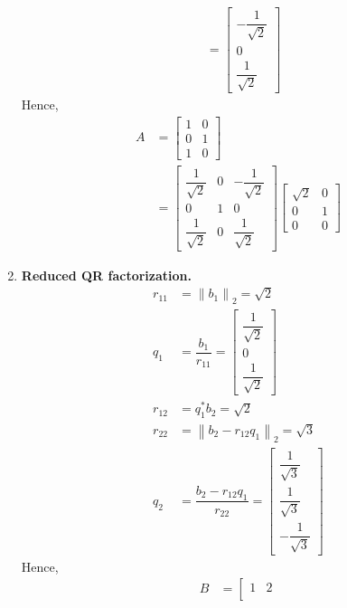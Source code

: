 \documentclass[a4paper,oneside]{book}
\numberwithin{equation}{chapter}
\begin{document}
\begin{enumerate}
\begin{align}
 &= \left[ {\begin{array}{*{20}{c}}
{ - \dfrac{1}{{\sqrt 2 }}}\\
0\\
{\dfrac{1}{{\sqrt 2 }}}
\end{array}} \right]
\end{align}
Hence, 
\begin{align}
A &= \left[ {\begin{array}{*{20}{c}}
1&0\\
0&1\\
1&0
\end{array}} \right]\\
 &= \left[ {\begin{array}{*{20}{c}}
{\dfrac{1}{{\sqrt 2 }}}&0&{ - \dfrac{1}{{\sqrt 2 }}}\\
0&1&0\\
{\dfrac{1}{{\sqrt 2 }}}&0&{\dfrac{1}{{\sqrt 2 }}}
\end{array}} \right]\left[ {\begin{array}{*{20}{c}}
{\sqrt 2 }&0\\
0&1\\
0&0
\end{array}} \right]
\end{align}
\item \textbf{\textsf{Reduced QR factorization.}}
\begin{align}
{r_{11}} &= {\left\| {{b_1}} \right\|_2} = \sqrt 2 \\
{q_1} &= \dfrac{{{b_1}}}{{{r_{11}}}} = \left[ {\begin{array}{*{20}{c}}
{\dfrac{1}{{\sqrt 2 }}}\\
0\\
{\dfrac{1}{{\sqrt 2 }}}
\end{array}} \right]\\
{r_{12}} &= q_1^*{b_2} = \sqrt 2 \\
{r_{22}} &= {\left\| {{b_2} - {r_{12}}{q_1}} \right\|_2} = \sqrt 3 \\
{q_2} &= \dfrac{{{b_2} - {r_{12}}{q_1}}}{{{r_{22}}}} = \left[ {\begin{array}{*{20}{c}}
{\dfrac{1}{{\sqrt 3 }}}\\
{\dfrac{1}{{\sqrt 3 }}}\\
{ - \dfrac{1}{{\sqrt 3 }}}
\end{array}} \right]
\end{align}
Hence, 
\begin{align}
B &= \left[ {\begin{array}{*{20}{c}}
1&2\\

\end{array}}
\end{align}
\end{enumerate}
\end{document}
